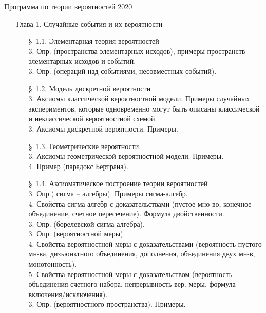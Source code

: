\documentclass[10pt]{amsart}
\begin{document}
\thispagestyle{empty}

\begin{center}
    {\Large Программа по теории вероятностей 2020}
\end{center}


\begin{enumerate}
\item[Глава 1.] Случайные события и их вероятности \\
\begin{enumerate}
\item[\S\, 1.1.] Элементарная теория вероятностей \\
3. Опр. (пространства элементарных исходов), примеры пространств элементарных исходов и событий. \\
3. Опр. (операций над событиями, несовместных событий). \\
\item[\S\, 1.2.] Модель дискретной вероятности \\
3. Аксиомы классической вероятностной модели. Примеры случайных экспериментов, которые одновременно могут быть описаны классической и неклассической вероятностной схемой. \\
3. Аксиомы дискретной вероятности. Примеры. \\
\item[\S\, 1.3.] Геометрические вероятности. \\
3. Аксиомы геометрической вероятностной модели. Примеры. \\
4. Пример (парадокс Бертрана). \\ 

\item[\S\, 1.4.] Аксиоматическое построение теории вероятностей \\ 
3. Опр.( сигма – алгебры). Примеры сигма-алгебр. \\
4. Свойства сигма-алгебр с доказательствами (пустое мно-во, конечное объединение, счетное пересечение). Формула двойственности. \\
3. Опр. (борелевской сигма-алгебра). \\
3. Опр. (вероятностной меры). \\
4. Свойства вероятностной меры с доказательствами (вероятность пустого мн-ва, дизъюнктного объединения, дополнения, объединения двух мн-в, монотонность). \\
5. Свойства  вероятностной меры с доказательством (вероятность объединения счетного набора, непрерывность вер. меры, формула включения/исключения). \\
3. Опр. (вероятностного пространства). Примеры. \\


\end{enumerate}
\end{enumerate}
\end{document}
